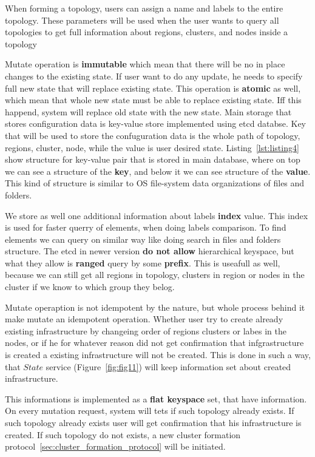 When forming a topology, users can assign a name and labels to the entire topology. These parameters will be used when the user wants to query all topologies to get full information about regions, clusters, and nodes inside a topology

Mutate operation is \textbf{immutable} which mean that there will be no in place changes to the existing state. If user want to do any update, he needs to specify full new state that will replace existing state. This operation is \textbf{atomic} as well, which mean that whole new state must be able to replace existing state. Iff this happend, system will replace old state with the new state. Main storage that stores configuration data is key-value store implemented using etcd databse. Key that will be used to store the confuguration data is the whole path of topology, regions, cluster, node, while the value is user desired state. Listing~\ref{lst:listing4} show structure for key-value pair that is stored in main database, where on top we can see a structure of the \textbf{key}, and below it we can see structure of the \textbf{value}. This kind of structure is similar to OS file-system data organizations of files and folders.



We store as well one additional information about labels \textbf{index} value. This index is used for faster querry of elements, when doing labels comparison. To find elements we can query on similar way like doing search in files and folders structure. The etcd in newer version \textbf{do not allow} hierarchical keyspace, but what they allow is \textbf{ranged} query by some \textbf{prefix}. This is useafull as well, because we can still get all regions in topology, clusters in region or nodes in the cluster if we know to which group they belog.

Mutate operaption is not idempotent by the nature, but whole process behind it make mutate an idempotent operation. Whether user try to create already existing infrastructure by changeing order of regions clusters or labes in the nodes, or if he for whatever reason did not get confirmation that infgrastructure is created a existing infrastructure will not be created. This is done in such a way, that $State$ service (Figure~\ref{fig:fig11}) will keep information set about created infrastructure. 

This informations is implemented as a \textbf{flat keyspace} set, that have information. On every mutation request, system will tets if such topology already exists. If such topology already exists user will get confirmation that his infrastructure is created. If such topology do not exists, a new cluster formation protocol~\ref{sec:cluster_formation_protocol} will be initiated.


